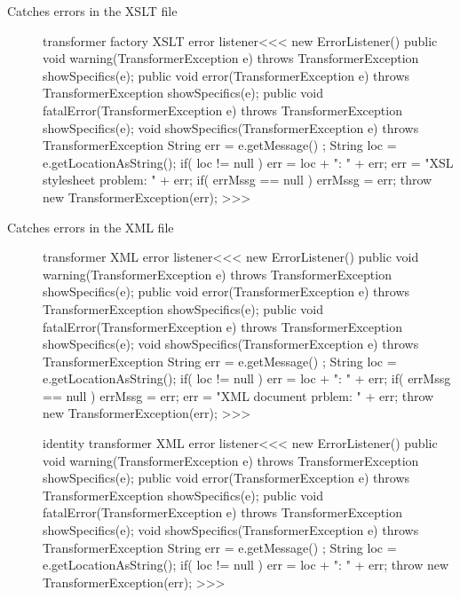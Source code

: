 \documentclass{article}
\begin{document}
\begin{description}
\item[Catches errors in the XSLT file]



\<transformer factory XSLT error listener\><<<
new ErrorListener() {
   public void warning(TransformerException e) throws TransformerException {
     showSpecifics(e);
   }
   public void error(TransformerException e) throws TransformerException {
     showSpecifics(e);
   }
   public void fatalError(TransformerException e) throws TransformerException {
     showSpecifics(e);
   }
   void showSpecifics(TransformerException e)
                                               throws  TransformerException{
     String err = e.getMessage() ;
     String loc = e.getLocationAsString();
     if( loc != null ){ err = loc + ": " + err; }
     err = "XSL stylesheet problem: " + err;
     if( errMssg == null ){ errMssg = err; }
     throw new TransformerException(err);
}  }
>>>


\item [Catches errors in the XML file]

\<transformer XML error listener\><<<
new ErrorListener() {
   public void warning(TransformerException e) throws TransformerException {
     showSpecifics(e);
   }
   public void error(TransformerException e) throws TransformerException {
     showSpecifics(e);
   }
   public void fatalError(TransformerException e) throws TransformerException {
     showSpecifics(e);
   }
   void showSpecifics(TransformerException e)
                                               throws  TransformerException{
     String err = e.getMessage() ;
     String loc = e.getLocationAsString();
     if( loc != null ){ err = loc + ": " + err; }
     if( errMssg == null ){ errMssg = err; }
     err = "XML document prblem: " + err;
     throw new TransformerException(err);
}  }
>>>


\<identity transformer XML error listener\><<<
new ErrorListener() {
   public void warning(TransformerException e) throws TransformerException {
     showSpecifics(e);
   }
   public void error(TransformerException e) throws TransformerException {
     showSpecifics(e);
   }
   public void fatalError(TransformerException e) throws TransformerException {
     showSpecifics(e);
   }
   void showSpecifics(TransformerException e)
                                               throws  TransformerException{
     String err = e.getMessage() ;
     String loc = e.getLocationAsString();
     if( loc != null ){ err = loc + ": " + err; }
     throw new TransformerException(err);
}  }
>>>



\end{description}
\end{document}
